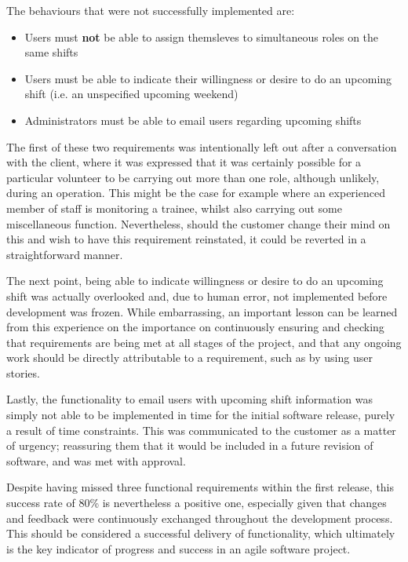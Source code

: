 The behaviours that were not successfully implemented are:

\begin{itemize}
    \item Users must \textbf{not} be able to assign themsleves to simultaneous roles on the same shifts
    \item Users must be able to indicate their willingness or desire to do an upcoming shift (i.e. an unspecified upcoming weekend)
    \item Administrators must be able to email users regarding upcoming shifts
\end{itemize}

The first of these two requirements was intentionally left out after a conversation with the client, where it was expressed that it was certainly possible for a particular volunteer to be carrying out more than one role, although unlikely, during an operation. This might be the case for example where an experienced member of staff is monitoring a trainee, whilst also carrying out some miscellaneous function. Nevertheless, should the customer change their mind on this and wish to have this requirement reinstated, it could be reverted in a straightforward manner.

The next point, being able to indicate willingness or desire to do an upcoming shift was actually overlooked and, due to human error, not implemented before development was frozen. While embarrassing, an important lesson can be learned from this experience on the importance on continuously ensuring and checking that requirements are being met at all stages of the project, and that any ongoing work should be directly attributable to a requirement, such as by using user stories. 

Lastly, the functionality to email users with upcoming shift information was simply not able to be implemented in time for the initial software release, purely a result of time constraints. This was communicated to the customer as a matter of urgency; reassuring them that it would be included in a future revision of software, and was met with approval.

Despite having missed three functional requirements within the first release, this success rate of 80\% is nevertheless a positive one, especially given that changes and feedback were continuously exchanged throughout the development process. This should be considered a successful delivery of functionality, which ultimately is the key indicator of progress and success in an agile software project. \cite{beck2001agile}

